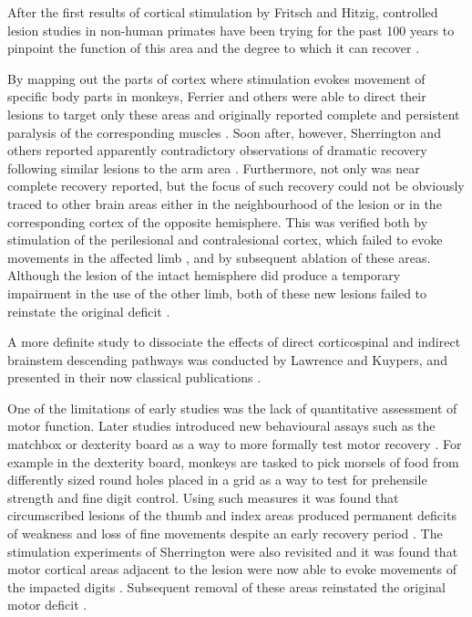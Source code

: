 After the first results of cortical stimulation by Fritsch and Hitzig, controlled lesion studies in non-human primates have been trying for the past 100 years to pinpoint the function of this area and the degree to which it can recover \cite{Darling2011}.

By mapping out the parts of cortex where stimulation evokes movement of specific body parts in monkeys, Ferrier and others were able to direct their lesions to target only these areas and originally reported complete and persistent paralysis of the corresponding muscles \cite{Ferrier1884}. Soon after, however, Sherrington and others reported apparently contradictory observations of dramatic recovery following similar lesions to the arm area \cite{GrahamBrown1913,Leyton1917}. Furthermore, not only was near complete recovery reported, but the focus of such recovery could not be obviously traced to other brain areas either in the neighbourhood of the lesion or in the corresponding cortex of the opposite hemisphere. This was verified both by stimulation of the perilesional and contralesional cortex, which failed to evoke movements in the affected limb \cite{Leyton1917}, and by subsequent ablation of these areas. Although the lesion of the intact hemisphere did produce a temporary impairment in the use of the other limb, both of these new lesions failed to reinstate the original deficit \cite{GrahamBrown1913,Leyton1917}.

A more definite study to dissociate the effects of direct corticospinal and indirect brainstem descending pathways was conducted by Lawrence and Kuypers, and presented in their now classical publications \cite{Lawrence1968,Lawrence1968a}.

One of the limitations of early studies was the lack of quantitative assessment of motor function. Later studies introduced new behavioural assays such as the matchbox or dexterity board as a way to more formally test motor recovery \cite{Glees1950,Cole1952}. For example in the dexterity board, monkeys are tasked to pick morsels of food from differently sized round holes placed in a grid as a way to test for prehensile strength and fine digit control. Using such measures it was found that circumscribed lesions of the thumb and index areas produced permanent deficits of weakness and loss of fine movements despite an early recovery period \cite{Glees1950}. The stimulation experiments of Sherrington were also revisited and it was found that motor cortical areas adjacent to the lesion were now able to evoke movements of the impacted digits \cite{Glees1950}. Subsequent removal of these areas reinstated the original motor deficit \cite{Glees1950}.

